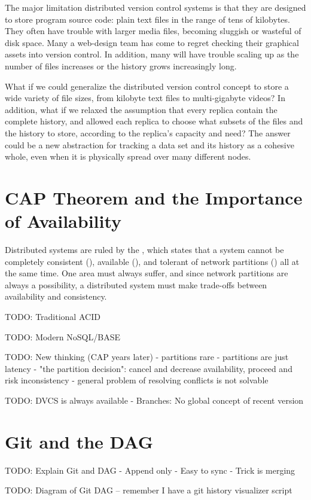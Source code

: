 The major limitation distributed version control systems is that they are
designed to store program source code: plain text files in the range of tens of
kilobytes. They often have trouble with larger media files, becoming sluggish or
wasteful of disk space. Many a web-design team has come to regret checking their
graphical assets into version control. In addition, many will have trouble
scaling up as the number of files increases or the history grows increasingly
long.

What if we could generalize the distributed version control concept to store a
wide variety of file sizes, from kilobyte text files to multi-gigabyte videos?
In addition, what if we relaxed the assumption that every replica contain the
complete history, and allowed each replica to choose what subsets of the files
and the history to store, according to the replica's capacity and need? The
answer could be a new abstraction for tracking a data set and its history as a
cohesive whole, even when it is physically spread over many different nodes.


\section{CAP Theorem and the Importance of Availability}

Distributed systems are ruled by the  \cite{cap_origin},
which states that a system cannot be completely consistent (),
available (), and tolerant of network partitions () all at
the same time. One area must always suffer, and since network partitions are
always a possibility, a distributed system must make trade-offs between
availability and consistency.

TODO: Traditional ACID

TODO: Modern NoSQL/BASE

TODO: New thinking (CAP years later)
   - partitions rare
   - partitions are just latency
   - "the partition decision": cancel and decrease availability, proceed and
   risk inconsistency
   - general problem of resolving conflicts is not solvable
   \cite{cap_years_later}

TODO: DVCS is always available
    - Branches: No global concept of recent version


\section{Git and the DAG}

TODO: Explain Git and DAG
    - Append only
    - Easy to sync
    - Trick is merging

TODO: Diagram of Git DAG -- remember I have a git history visualizer script
